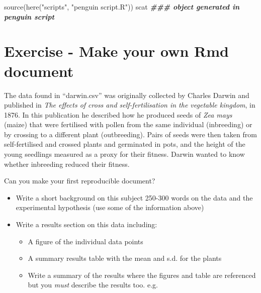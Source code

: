 \documentclass[
]{book}
\makeatletter
\newenvironment{Shaded}{\begin{snugshade}}{\end{snugshade}}
\newcommand{\DocumentationTok}[1]{\textcolor[rgb]{0.56,0.35,0.01}{\textbf{\textit{#1}}}}
\newcommand{\FunctionTok}[1]{\textcolor[rgb]{0.00,0.00,0.00}{#1}}
\newcommand{\NormalTok}[1]{#1}
\newcommand{\StringTok}[1]{\textcolor[rgb]{0.31,0.60,0.02}{#1}}
\newenvironment{kframe}{%
\medskip{}
\setlength{\fboxsep}{.8em}
 \def\at@end@of@kframe{}%
 \ifinner\ifhmode%
  \def\at@end@of@kframe{\end{minipage}}%
  \begin{minipage}{\columnwidth}%
 \fi\fi%
 \def\FrameCommand##1{\hskip\@totalleftmargin \hskip-\fboxsep
 \colorbox{shadecolor}{##1}\hskip-\fboxsep
     \hskip-\linewidth \hskip-\@totalleftmargin \hskip\columnwidth}%
 \MakeFramed {\advance\hsize-\width
   \@totalleftmargin\z@ \linewidth\hsize
   \@setminipage}}%
 {\par\unskip\endMakeFramed%
 \at@end@of@kframe}
\newenvironment{block}[1]
  {
  \begin{itemize}
  \renewcommand{\labelitemi}{
    \raisebox{-.7\height}[0pt][0pt]{
      {\setkeys{Gin}{width=3em,keepaspectratio}\texttt{[image: images/\#1]}}
    }
  }
  \setlength{\fboxsep}{1em}
  \begin{kframe}
  \item
  }
  {
  \end{kframe}
  \end{itemize}
  }
\newenvironment{rmdquestion}
  {\begin{block}{question}}
  {\end{block}}
\makeatother
\begin{document}
\begin{Shaded}
\begin{Highlighting}[]
\FunctionTok{source}\NormalTok{(}\FunctionTok{here}\NormalTok{(}\StringTok{"scripts"}\NormalTok{, }\StringTok{"penguin script.R"}\NormalTok{))}
\NormalTok{scat }\DocumentationTok{\#\#\# object generated in penguin script}
\end{Highlighting}
\end{Shaded}

\hypertarget{exercise---make-your-own-rmd-document}{%
\section{Exercise - Make your own Rmd document}\label{exercise---make-your-own-rmd-document}}

The data found in ``darwin.csv'' was originally collected by Charles Darwin and published in \emph{The effects of cross and self-fertilisation in the vegetable kingdom}, in 1876. In this publication he described how he produced seeds of \emph{Zea mays} (maize) that were fertilised with pollen from the same individual (inbreeding) or by crossing to a different plant (outbreeding). Pairs of seeds were then taken from self-fertilised and crossed plants and germinated in pots, and the height of the young seedlings measured as a proxy for their fitness. Darwin wanted to know whether inbreeding reduced their fitness.

\begin{rmdquestion}
Can you make your first reproducible document?
\end{rmdquestion}

\begin{itemize}
\item
  Write a short background on this subject 250-300 words on the data and the experimental hypothesis (use some of the information above)
\item
  Write a results section on this data including:

  \begin{itemize}
  \item
    A figure of the individual data points
  \item
    A summary results table with the mean and s.d. for the plants
  \item
    Write a summary of the results where the figures and table are referenced but you \emph{must} describe the results too. e.g.~
  \end{itemize}
\end{itemize}
\end{document}
